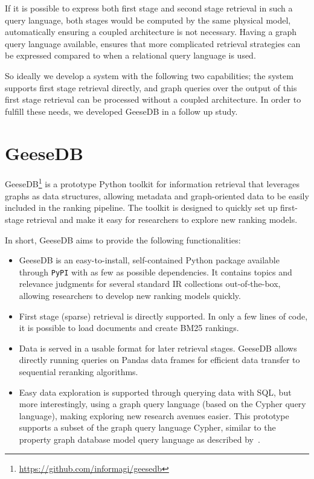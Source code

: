 If it is possible to express both first stage and second stage retrieval in such a query language, both stages would be computed by the same physical model, automatically ensuring a coupled architecture is not necessary. Having a graph query language available, ensures that more complicated retrieval strategies can be expressed compared to when a relational query language is used. 

So ideally we develop a system with the following two capabilities; the system supports first stage retrieval directly, and graph queries over the output of this first stage retrieval can be processed without a coupled architecture. In order to fulfill these needs, we developed GeeseDB in a follow up study. 

\section{GeeseDB}
GeeseDB\footnote{\url{https://github.com/informagi/geesedb}} is a prototype Python toolkit for information retrieval that leverages graphs as data structures, allowing metadata and graph-oriented data to be easily included in the ranking pipeline. The toolkit is designed to quickly set up first-stage retrieval and make it easy for researchers to explore new ranking models. 

In short, GeeseDB aims to provide the following functionalities:
\begin{itemize}
	\item GeeseDB is an easy-to-install, self-contained Python package available through \texttt{PyPI} with as few as possible dependencies. It contains topics and relevance judgments for several standard IR collections out-of-the-box, allowing researchers to develop new ranking models quickly. 
	\item First stage (sparse) retrieval is directly supported. In only a few lines of code, it is possible to load documents and create BM25 rankings. 
	\item Data is served in a usable format for later retrieval stages. GeeseDB allows directly running queries on Pandas data frames for efficient data transfer to sequential reranking algorithms.
	\item Easy data exploration is supported through querying data with SQL, but more interestingly, using a graph query language (based on the Cypher query language), making exploring new research avenues easier. This prototype supports a subset of the graph query language Cypher, similar to the property graph database model query language as described by~\citet{angles2018property}.
\end{itemize}

